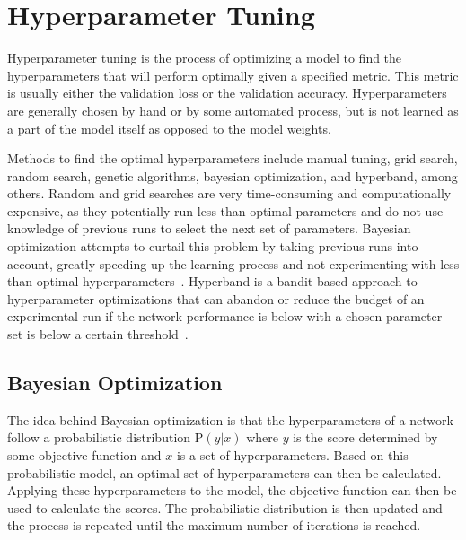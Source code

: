 \section{Hyperparameter Tuning}\label{section:background-hyperparameter}
Hyperparameter tuning is the process of optimizing a model to find the hyperparameters that will perform optimally given a specified metric. This metric is usually either the validation loss or the validation accuracy.
Hyperparameters are generally chosen by hand or by some automated process, but is not learned as a part of the model itself as opposed to the model weights.

Methods to find the optimal hyperparameters include manual tuning, grid search, random search, genetic algorithms, bayesian optimization, and hyperband, among others.
Random and grid searches are very time-consuming and computationally expensive, as they potentially run less than optimal parameters and do not use knowledge of previous runs to select the next set of parameters.
Bayesian optimization attempts to curtail this problem by taking previous runs into account, greatly speeding up the learning process and not experimenting with less than optimal hyperparameters~\cite{bayesian}.
Hyperband is a bandit-based approach to hyperparameter optimizations that can abandon or reduce the budget of an experimental run if the network performance is below with a chosen parameter set is below a certain threshold~\cite{hyperband}.

\subsection{Bayesian Optimization}\label{subsection:background-bayesian}
The idea behind Bayesian optimization is that the hyperparameters of a network follow a probabilistic distribution $\text{P}(y | x)$ where $y$ is the score determined by some objective function and $x$ is a set of hyperparameters.
Based on this probabilistic model, an optimal set of hyperparameters can then be calculated.
Applying these hyperparameters to the model, the objective function can then be used to calculate the scores.
The probabilistic distribution is then updated and the process is repeated until the maximum number of iterations is reached.

